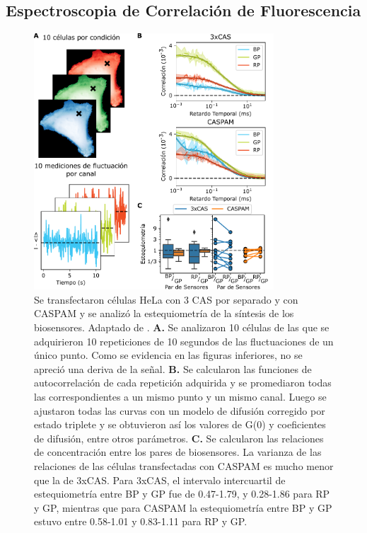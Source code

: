 \subsection{Espectroscopia de Correlación de Fluorescencia}


\begin{figure}[b!]
    \centering
    \includegraphics[width=0.8\textwidth]{img/cap_3/FCS.pdf}
    \caption{\footnotesize{Se transfectaron células HeLa con 3 CAS por separado y con CASPAM y se analizó la estequiometría de la síntesis de los biosensores. Adaptado de \cite{Habif2021}. \textbf{A.} Se analizaron 10 células de las que se adquirieron 10 repeticiones de 10 segundos de las fluctuaciones de un único punto. Como se evidencia en las figuras inferiores, no se apreció una deriva de la señal. \textbf{B.} Se calcularon las funciones de autocorrelación de cada repetición adquirida y se promediaron todas las correspondientes a un mismo punto y un mismo canal. Luego se ajustaron todas las curvas con un modelo de difusión corregido por estado triplete y se obtuvieron así los valores de G(0) y coeficientes de difusión, entre otros parámetros. \textbf{C.} Se calcularon las relaciones de concentración entre los pares de biosensores. La varianza de las relaciones de las células transfectadas con CASPAM es mucho menor que la de 3xCAS. Para  3xCAS, el intervalo intercuartil de estequiometría entre BP y GP fue de 0.47-1.79, y 0.28-1.86 para RP y GP, mientras que para CASPAM la estequiometría entre BP y GP estuvo entre 0.58-1.01 y 0.83-1.11 para RP y GP.}}
    \label{fig:FCS}
\end{figure}

